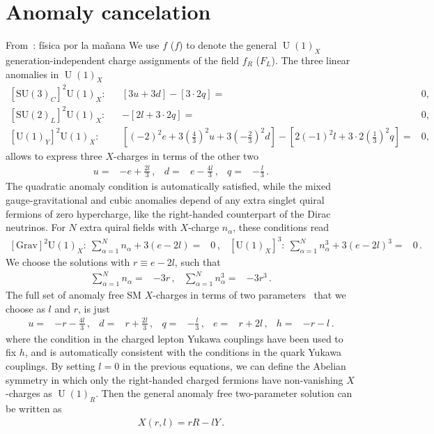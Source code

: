 \documentclass[prd,amsfonts,aps,nofootinbib,notitlepage,11pt,superscriptaddress]{revtex4-1}
\begin{document}
\section{Anomaly cancelation}
From~\cite{Calle:2019mxn}:
física por la mañana
We use $f$ ($f$) to denote the general $\operatorname{U}(1)_X$ generation-independent charge assignments of the field $f_R$ ($F_L$). The three linear anomalies in $\operatorname{U}(1)_X$~\cite{Campos:2017dgc}
\begin{align}
  \label{eq:anolin}
  \left[\mathrm{SU}(3)_{C}\right]^{2} \mathrm{U}(1)_{X} :& &
[3 u+3 d]-[3 \cdot 2 q]=&0, \nonumber\\
\left[\mathrm{SU}(2)_{L}\right]^{2} \mathrm{U}(1)_{X} :&&
-[2 l+3 \cdot 2 q]=&0, \nonumber\\
\left[\mathrm{U}(1)_{Y}\right]^{2} \mathrm{U}(1)_{X} :&&
{ \left[(-2)^{2} e+3\left(\tfrac{4}{3}\right)^{2} u+3\left(-\tfrac{2}{3}\right)^{2} d\right]-\left[2(-1)^{2} l+3 \cdot 2\left(\tfrac{1}{3}\right)^{2} q\right]}=&
 0,
  \end{align}
allows to express three $X$-charges in terms of the other two
\begin{align}
  u=&-e+\frac{2l}{3}\,,& d=& e-\frac{4l}{3}\,,& q=& -\frac{l}{3}\,.
\end{align}
The quadratic anomaly condition is automatically satisfied, while the mixed gauge-gravitational and cubic anomalies depend of any extra singlet quiral fermions of zero hypercharge, like the right-handed counterpart of the Dirac neutrinos. For $N$ extra quiral fields with $X$-charge $n_{\alpha}$, these conditions read
\begin{align}
  \left[\text{Grav}\right]^{2} \mathrm{U}(1)_{X}:\ \sum_{\alpha=1}^N n_{\alpha}+3 (e-2l)=&0\,, &  \left[\mathrm{U}(1)_{X}\right]^{3}:\ \sum_{\alpha=1}^N n_{\alpha}^3+3 (e-2l)^3=&0\,. &
\end{align}
We choose the solutions with $r\equiv e-2l$, such that
\begin{align}
  \label{eq:anolam}
  \sum_{\alpha=1}^{N} n_{\alpha}=&-3 r\,,   & \sum_{\alpha=1}^{N} n_{\alpha}^3=&-3 r^3\,.
\end{align}
The full set of anomaly free SM $X$-charges in terms of two parameters~\cite{Appelquist:2002mw,Campos:2017dgc,Allanach:2018vjg} that we choose as $l$ and $r$, is just
\begin{align}
  u=&-r-\frac{4l}{3}\,,&d=&r+\frac{2l}{3}\,,&q=&-\frac{l}{3}\,,&e=&r+2l\,,&h=&-r-l\,.
  \label{Eq:SMCharges}
\end{align}
where the condition in the charged lepton Yukawa couplings have been used to fix $h$, and is automatically consistent with the conditions in the quark Yukawa couplings. By setting $l=0$ in the previous equations, we can define the Abelian symmetry in which only the right-handed charged fermions have non-vanishing $X$-charges as $\operatorname{U}(1)_R$. Then the general anomaly free two-parameter solution can be written as
\begin{align}
  X(r,l)=r R- l Y\,.
\end{align}
\end{document}
